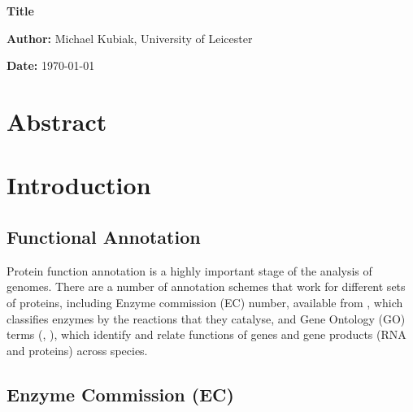 \documentclass[12pt]{report}
\begin{document}
	\vspace*{\fill}
		\begin{center}
			\huge\textbf{Title}

			\vspace*{2cm}
			
			\large\textbf{Author:} Michael Kubiak, University of Leicester

			\vspace*{.5cm}

			\textbf{Date:} \today
			
		
		\end{center}
	\vspace*{\fill}

\pagebreak

	\section*{Abstract}
		
		
		
\pagebreak

	\tableofcontents

\pagebreak

	\section{Introduction}

		\subsection{Functional Annotation}

			Protein function annotation is a highly important stage of the analysis of genomes.  There are a number of annotation schemes that work for different sets of proteins, including Enzyme commission (EC) number, available from \cite{RefWorks:doc:5d80ae45e4b02466bec37c88}, which classifies enzymes by the reactions that they catalyse, and Gene Ontology (GO) terms (\cite{RefWorks:doc:5d80b66be4b07e3e85c92789}, \cite{RefWorks:doc:5d80b886e4b02466bec38715}), which identify and relate functions of genes and gene products (RNA and proteins) across species.  
			
		\subsection{Enzyme Commission (EC)}
\end{document}
